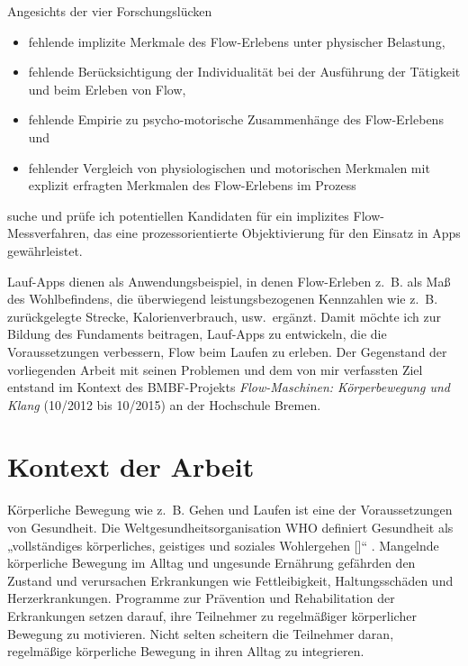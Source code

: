 Angesichts der vier Forschungslücken 
\begin{itemize}
	
	\item fehlende implizite Merkmale des Flow-Erlebens unter physischer Belastung,
	
	\item fehlende Berücksichtigung der Individualität bei der Ausführung der Tätigkeit und beim Erleben von Flow,
	
	\item fehlende Empirie zu psycho-motorische Zusammenhänge des Flow-Erlebens und
	
	\item fehlender Vergleich von physiologischen und motorischen Merkmalen mit explizit erfragten Merkmalen des Flow-Erlebens im Prozess 
\end{itemize}
suche und prüfe ich potentiellen Kandidaten für ein implizites Flow-Messverfahren, das eine prozessorientierte Objektivierung für den Einsatz in Apps gewährleistet. 

Lauf-Apps dienen als Anwendungsbeispiel, in denen Flow-Erleben z.~B. als Maß des Wohlbefindens, die überwiegend leistungsbezogenen Kennzahlen wie z.~B. zurückgelegte Strecke, Kalorienverbrauch, usw.\ ergänzt. Damit möchte ich zur Bildung des Fundaments beitragen, Lauf-Apps zu entwickeln, die die Voraussetzungen verbessern, Flow beim Laufen zu erleben. Der Gegenstand der vorliegenden Arbeit mit seinen Problemen und dem von mir verfassten Ziel entstand im Kontext des \acs{BMBF}-Projekts \emph{Flow-Maschinen: Körperbewegung und Klang} (10/2012 bis 10/2015) an der Hochschule Bremen.

\section{Kontext der Arbeit} 

\label{sec:kontext_der_arbeit}

Körperliche Bewegung wie z.~B. Gehen und Laufen ist eine der Voraussetzungen von Gesundheit. Die Weltgesundheitsorganisation \ac{WHO} definiert Gesundheit als „vollständiges körperliches, geistiges und soziales Wohlergehen [\textellipsis]“ \citep[S.~100]{WorldHealthOrganization1948}. Mangelnde körperliche Bewegung im Alltag und ungesunde Ernährung gefährden den Zustand und verursachen Erkrankungen wie Fettleibigkeit, Haltungsschäden und Herzerkrankungen. Programme zur Prävention und Rehabilitation der Erkrankungen setzen darauf, ihre Teilnehmer zu regelmäßiger körperlicher Bewegung zu motivieren. Nicht selten scheitern die Teilnehmer daran, regelmäßige körperliche Bewegung in ihren Alltag zu integrieren.

